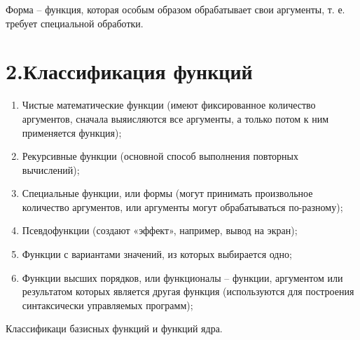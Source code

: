 \documentclass[12pt]{report}
\begin{document}
	Форма -- функция, которая особым образом обрабатывает свои аргументы, т. е. требует специальной обработки.
	
	
	
	
	\section*{2.Классификация функций}
	
	
	\begin{enumerate}
		\item Чистые  математические функции (имеют фиксированное количество аргументов, сначала выяисляются все аргументы, а только потом к ним применяется функция);
		\item Рекурсивные функции (основной способ выполнения повторных вычислений);
		\item Специальные функции, или формы (могут принимать произвольное количество аргументов, или аргументы могут обрабатываться по-разному);
		\item Псевдофункции (создают «эффект», например, вывод на экран);
		\item Функции с вариантами значений, из которых выбирается одно;
		\item Функции высших порядков, или функционалы --  функции, аргументом или  результатом которых является другая функция (используются для построения синтаксически управляемых программ);
	\end{enumerate}
	
	Классификаци базисных функций и функций ядра.
	
\end{document}
